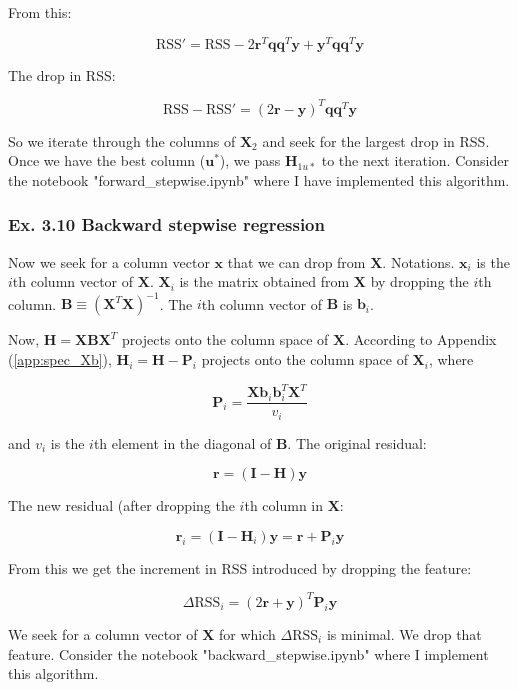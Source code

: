\documentclass{article}
\begin{document}
From this:

\[
\text{RSS}' = \text{RSS} -2\mathbf{r}^T \mathbf{q}\mathbf{q}^T \mathbf{y} + \mathbf{y}^T\mathbf{q}\mathbf{q}^T\mathbf{y}
\]

The drop in RSS:

\[
\text{RSS} - \text{RSS}' = (2\mathbf{r} - \mathbf{y})^T\mathbf{q}\mathbf{q}^T\mathbf{y}
\]

So we iterate through the columns of $\mathbf{X}_2$ and seek for the largest drop in RSS. Once we have the best column ($\mathbf{u}^{*}$), we pass $\mathbf{H}_{1u*}$ to the next iteration. Consider the notebook "forward\_stepwise.ipynb" where I have implemented this algorithm.

\subsubsection{Ex. 3.10 Backward stepwise regression}

Now we seek for a column vector $\mathbf{x}$ that we can drop from $\mathbf{X}$. Notations. $\mathbf{x}_i$ is the $i$th column vector of $\mathbf{X}$. $\mathbf{X}_i$ is the matrix obtained from $\mathbf{X}$ by dropping the $i$th column. $\mathbf{B} \equiv (\mathbf{X}^T\mathbf{X})^{-1}$. The $i$th column vector of $\mathbf{B}$ is $\mathbf{b}_i$.

Now, $\mathbf{H} = \mathbf{X}\mathbf{B}\mathbf{X}^T$ projects onto the column space of $\mathbf{X}$. According to Appendix (\ref{app:spec_Xb}), $\mathbf{H}_i = \mathbf{H} - \mathbf{P}_i$ projects onto the column space of $\mathbf{X}_i$, where

\[
\mathbf{P}_i = \frac{\mathbf{X}\mathbf{b}_i \mathbf{b}^T_i \mathbf{X}^T}{v_i}
\]

and $v_i$ is the $i$th element in the diagonal of $\mathbf{B}$. The original residual:

\[
\mathbf{r} = (\mathbf{I} - \mathbf{H})\mathbf{y}
\]

The new residual (after dropping the $i$th column in $\mathbf{X}$:

\[
\mathbf{r}_i = (\mathbf{I} - \mathbf{H}_i)\mathbf{y} = \mathbf{r} + \mathbf{P}_i \mathbf{y}
\]

From this we get the increment in RSS introduced by dropping the feature:

\[
\Delta \text{RSS}_i = (2\mathbf{r} + \mathbf{y})^T \mathbf{P}_i \mathbf{y}
\]

We seek for a column vector of $\mathbf{X}$ for which $\Delta\text{RSS}_i$ is minimal. We drop that feature. Consider the notebook "backward\_stepwise.ipynb" where I implement this algorithm.
\end{document}
